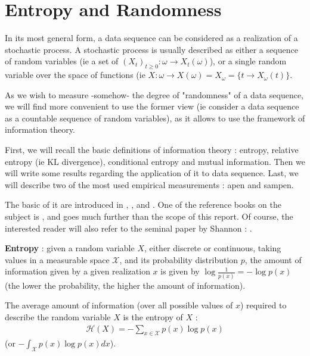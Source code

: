 \chapter{Entropy and Randomness}\label{sec:Entropy and randomness}

In its most general form, a data sequence can be considered as a realization of a stochastic process. A stochastic process is usually described as either a sequence of random variables (ie a set of $(X_t)_{t \geq 0} : \omega \rightarrow X_t({\omega})$), or a single random variable over the space of functions (ie $X : \omega \rightarrow X(\omega) = X_{\omega} = \{ t \rightarrow X_{\omega}(t) \}$.

As we wish to measure -somehow- the degree of "randomness" of a data sequence, we will find more convenient to use the former view (ie consider a data sequence as a countable sequence of random variables), as it allows to use the framework of information theory.

First, we will recall the basic definitions of information theory : entropy, relative entropy (ie KL divergence), conditional entropy and mutual information. Then we will write some results regarding the application of \gls{it} to data sequence. Last, we will describe two of the most used empirical measurements : \gls{apen} and \gls{sampen}.

The basic of \gls{it} are introduced in \cite{bishop_pattern_2016}, \cite{ProbabilisticGraphicalModels}, and \cite{ProbabilisticMachineLearning}. One of the reference books on the subject is \cite{cover_elements_2006}, and goes much further than the scope of this report. Of course, the interested reader will also refer to the seminal paper by Shannon : \cite{shannon_mathematical_1948}.

\textbf{Entropy} : given a random variable $X$, either discrete or continuous, taking values in a measurable space $\mathcal{X}$, and its probability distribution $p$, the amount of information given by a given realization $x$ is given by $\log{\frac{1}{p(x)}} = - \log{p(x)}$ (the lower the probability, the higher the amount of information). 

The average amount of information (over all possible values of $x$) required to describe the random variable $X$ is the entropy of $X$ : 
\begin{align}
    \mathcal{H}(X) = - \sum_{x \in \mathcal{X}} p(x)\log{p(x)}
\end{align}
(or $-\int_{\mathcal{X}} p(x)\log{p(x)}dx$).

